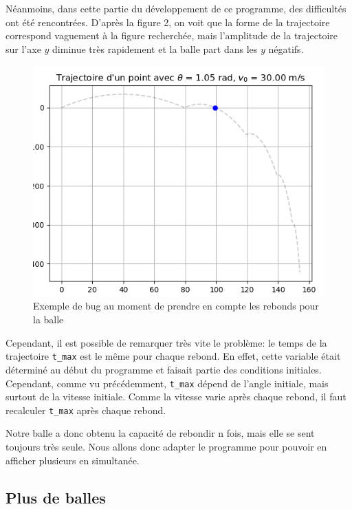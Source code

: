 \documentclass[a4paper, 11pt]{article}
\begin{document}
Néanmoins, dans cette partie du développement de ce programme, des difficultés ont été rencontrées. D'après la figure 2, on voit que la forme de la trajectoire correspond vaguement à la figure recherchée, mais l'amplitude de la trajectoire sur l'axe $y$ diminue très rapidement et la balle part dans les $y$ négatifs.

\begin{figure}[H]
	\centering
	\includegraphics[scale=0.4]{Figures/bug_classe_rebond.png}
	\caption{Exemple de bug au moment de prendre en compte les rebonds pour la balle}
	\label{fig:bug_reb} 
\end{figure}

Cependant, il est possible de remarquer très vite le problème: le temps de la trajectoire \verb|t_max| est le même pour chaque rebond. En effet, cette variable était déterminé au début du programme et faisait partie des conditions initiales. Cependant, comme vu précédemment, \verb|t_max| dépend de l'angle initiale, mais surtout de la vitesse initiale. Comme la vitesse varie après chaque rebond, il faut recalculer \verb|t_max| après chaque rebond.

Notre balle a donc obtenu la capacité de rebondir n fois, mais elle se sent toujours très seule. Nous allons donc adapter le programme pour pouvoir en afficher plusieurs en simultanée.


\subsection{Plus de balles}
\end{document}
